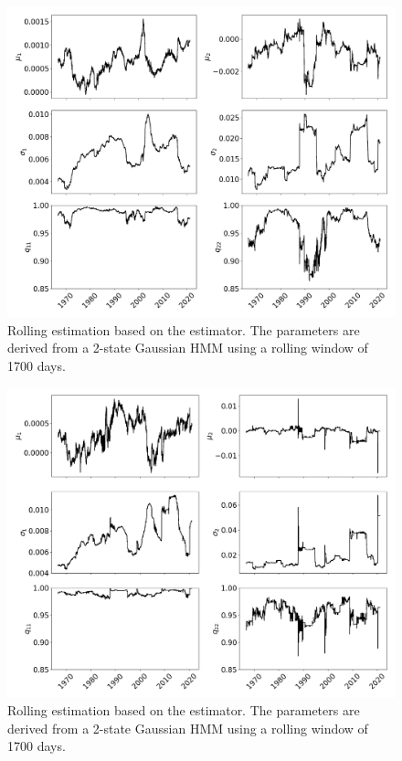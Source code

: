 \begin{figure}[H] 
    \centering
    \includegraphics[width=1.0\textwidth, height=0.5\textheight]{analysis/stylized_facts/images/2-state MLE HMM rolling params.png}
    \caption[Rolling estimation based on the \mle estimator]{Rolling estimation based on the \mle estimator. The parameters are derived from a 2-state Gaussian HMM using a rolling window of 1700 days.}
    \label{fig: MLE estimation rolling parameters} 
\end{figure}

\begin{figure}[H] 
    \centering
    \includegraphics[width=1.0\textwidth, height=0.5\textheight]{analysis/stylized_facts/images/2-state JUMP HMM rolling params.png}
    \caption[Rolling estimation based on the \jump estimator]{Rolling estimation based on the \jump estimator. The parameters are derived from a 2-state Gaussian HMM using a rolling window of 1700 days.}
    \label{fig: Jump estimation rolling parameters} 
\end{figure}

